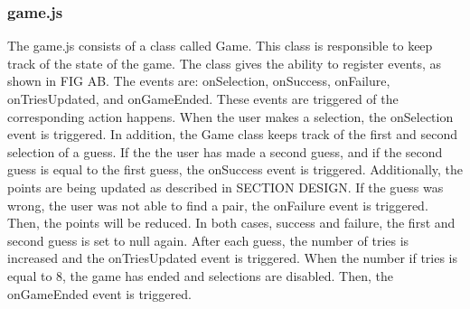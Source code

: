 \subsubsection{game.js}
The game.js consists of a class called Game. This class is responsible to keep track of the state of the game.
The class gives the ability to register events, as shown in FIG AB. The events are: onSelection, onSuccess, onFailure, onTriesUpdated, and onGameEnded. These events are triggered of the corresponding action happens.
When the user makes a selection, the onSelection event is triggered. In addition, the Game class keeps track of the first and second selection of a guess.
If the the user has made a second guess, and if the second guess is equal to the first guess, the onSuccess event is triggered. Additionally, the points are being updated as described in SECTION DESIGN.
If the guess was wrong, the user was not able to find a pair, the onFailure event is triggered. Then, the points will be reduced.
In both cases, success and failure, the first and second guess is set to null again.
After each guess, the number of tries is increased and the onTriesUpdated event is triggered.
%
When the number if tries is equal to 8, the game has ended and selections are disabled. Then, the onGameEnded event is triggered.

